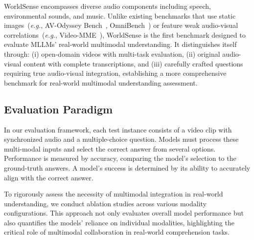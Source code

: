WorldSense encompasses diverse audio components including speech, environmental sounds, and music. Unlike existing benchmarks that use static images~({\em e.g.}, AV-Odyssey Bench~\cite{gong2024av}, OmniBench~\cite{li2024omnibench}) or feature weak audio-visual correlations~({\em e.g.}, Video-MME~\cite{fu2024video}), WorldSense is the first benchmark designed to evaluate MLLMs' real-world multimodal understanding. It distinguishes itself through: (i) open-domain videos with multi-task evaluation, (ii) original audio-visual content with complete transcriptions, and (iii) carefully crafted questions requiring true audio-visual integration, establishing a more comprehensive benchmark for real-world multimodal understanding assessment.

\subsection{Evaluation Paradigm}
In our evaluation framework, each test instance consists of a video clip with synchronized audio and a multiple-choice question. Models must process these multi-modal inputs and select the correct answer from several options. Performance is measured by accuracy, comparing the model’s selection to the ground-truth answers. 
A model’s success is determined by its ability to accurately align with the correct answer.

To rigorously assess the necessity of multimodal integration in real-world understanding, we conduct ablation studies across various modality configurations. This approach not only evaluates overall model performance but also quantifies the models’ reliance on individual modalities, highlighting the critical role of multimodal collaboration in real-world comprehension tasks.











